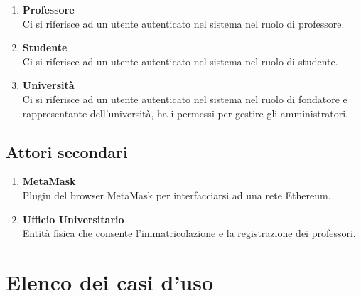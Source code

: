 \documentclass[AnalisiDeiRequisiti.tex]{subfiles}
\begin{document}
\begin{enumerate}
	\item \textbf{Professore}\\
	Ci si riferisce ad un utente autenticato nel sistema nel ruolo di professore.\\
	
	\item \textbf{Studente}\\
	Ci si riferisce ad un utente autenticato nel sistema nel ruolo di studente.\\
		
	\item \textbf{Università}\\
	Ci si riferisce ad un utente autenticato nel sistema nel ruolo di fondatore e rappresentante dell'università, ha i permessi per gestire gli amministratori.\\	
\end{enumerate}

\subsection{Attori secondari}
\begin{enumerate}
	\item \textbf{MetaMask}\\
	Plugin del browser MetaMask per interfacciarsi ad una rete Ethereum.\\
	
	\item \textbf{Ufficio Universitario}\\
	Entità fisica che consente l'immatricolazione e la registrazione dei professori.\\
\end{enumerate}

\section{Elenco dei casi d'uso}
\end{document}

